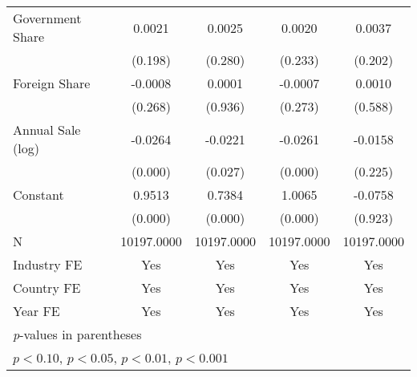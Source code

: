 {\begin{tabular}{l*{4}{c}}
Government Share    &      0.0021         &      0.0025         &      0.0020         &      0.0037         \\
                    &     (0.198)         &     (0.280)         &     (0.233)         &     (0.202)         \\
Foreign Share       &     -0.0008         &      0.0001         &     -0.0007         &      0.0010         \\
                    &     (0.268)         &     (0.936)         &     (0.273)         &     (0.588)         \\
Annual Sale (log)   &     -0.0264\sym{***}&     -0.0221\sym{*}  &     -0.0261\sym{***}&     -0.0158         \\
                    &     (0.000)         &     (0.027)         &     (0.000)         &     (0.225)         \\
Constant            &      0.9513\sym{***}&      0.7384\sym{***}&      1.0065\sym{***}&     -0.0758         \\
                    &     (0.000)         &     (0.000)         &     (0.000)         &     (0.923)         \\
\hline
N                   &  10197.0000         &  10197.0000         &  10197.0000         &  10197.0000         \\
Industry FE         &         Yes         &         Yes         &         Yes         &         Yes         \\
Country FE          &         Yes         &         Yes         &         Yes         &         Yes         \\
Year FE             &         Yes         &         Yes         &         Yes         &         Yes         \\
\hline\hline
\multicolumn{5}{l}{\footnotesize \textit{p}-values in parentheses}\\
\multicolumn{5}{l}{\footnotesize \sym{+} \(p<0.10\), \sym{*} \(p<0.05\), \sym{**} \(p<0.01\), \sym{***} \(p<0.001\)}\\
\end{tabular}
}
